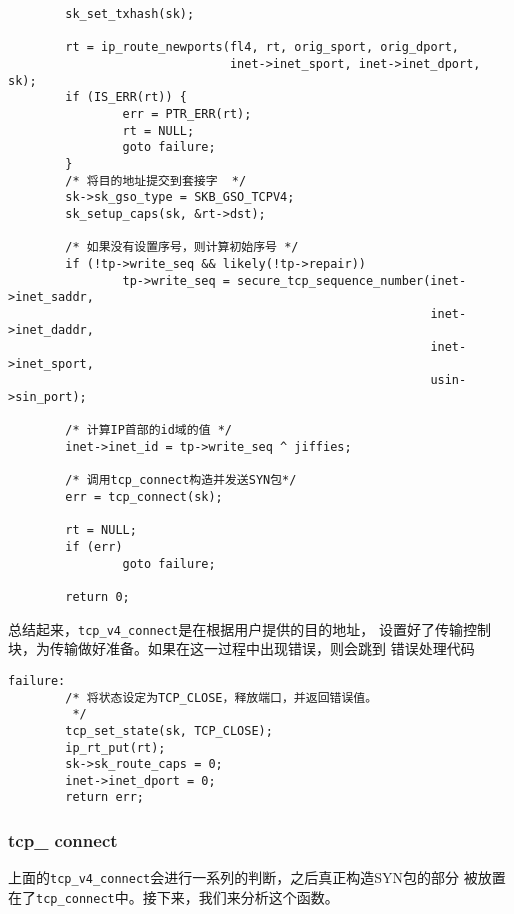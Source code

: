 \begin{verbatim}
        sk_set_txhash(sk);

        rt = ip_route_newports(fl4, rt, orig_sport, orig_dport,
                               inet->inet_sport, inet->inet_dport, sk);
        if (IS_ERR(rt)) {
                err = PTR_ERR(rt);
                rt = NULL;
                goto failure;
        }
        /* 将目的地址提交到套接字  */
        sk->sk_gso_type = SKB_GSO_TCPV4;
        sk_setup_caps(sk, &rt->dst);

        /* 如果没有设置序号，则计算初始序号 */
        if (!tp->write_seq && likely(!tp->repair))
                tp->write_seq = secure_tcp_sequence_number(inet->inet_saddr,
                                                           inet->inet_daddr,
                                                           inet->inet_sport,
                                                           usin->sin_port);
                                                           
        /* 计算IP首部的id域的值 */
        inet->inet_id = tp->write_seq ^ jiffies;

        /* 调用tcp_connect构造并发送SYN包*/
        err = tcp_connect(sk);

        rt = NULL;
        if (err)
                goto failure;

        return 0;
\end{verbatim}
总结起来，\texttt{tcp_v4_connect}是在根据用户提供的目的地址，
设置好了传输控制块，为传输做好准备。如果在这一过程中出现错误，则会跳到
错误处理代码
\begin{verbatim}
failure:
        /* 将状态设定为TCP_CLOSE，释放端口，并返回错误值。
         */
        tcp_set_state(sk, TCP_CLOSE);
        ip_rt_put(rt);
        sk->sk_route_caps = 0;
        inet->inet_dport = 0;
        return err;
\end{verbatim}

\subsubsection{tcp\_ connect}
上面的\texttt{tcp_v4_connect}会进行一系列的判断，之后真正构造SYN包的部分
被放置在了\texttt{tcp_connect}中。接下来，我们来分析这个函数。

